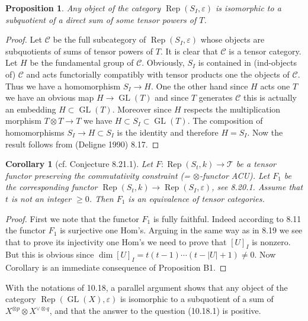 \documentclass[11pt,a4paper]{article}
\theoremstyle{plain}
\newtheorem{proposition}[theorem]{Proposition}
\newtheorem{corollary}[theorem]{Corollary}
\theoremstyle{definition}
\DeclareMathOperator{\Rep}{Rep}
\DeclareMathOperator{\GL}{GL}
\newcommand{\eps}{\varepsilon}
\begin{document}
\begin{proposition}
Any object of the category $\Rep(S_I, \eps)$ is isomorphic to a subquotient of a direct sum of some tensor powers of $T$.
\end{proposition}

\begin{proof}
Let $\mathcal{C}$ be the full subcategory of $\Rep(S_I, \eps)$ whose objects are subquotients of sums of tensor powers of $T$. It is clear that $\mathcal{C}$ is a tensor category. Let $H$ be the fundamental group of $\mathcal{C}$. Obviously, $S_I$ is contained in (ind-objects of) $\mathcal{C}$ and acts functorially compatibly with tensor products one the objects of $\mathcal{C}$. Thus we have a homomorphism $S_I \to H$. One the other hand since $H$ acts one $T$ we have an obvious map $H \to \GL(T)$ and since $T$ generates $\mathcal{C}$ this is actually an embedding $H \subset \GL(T)$. Moreover since $H$ respects the multiplication morphism $T \otimes T \to T$ we have $H \subset S_I \subset \GL(T)$. The composition of homomorphisms $S_I \to H \subset S_I$ is the identity and therefore $H = S_I$. Now the result follows from (Deligne 1990) 8.17.
\end{proof}

\begin{corollary}[cf. Conjecture 8.21.1]
Let $F : \Rep(S_t, k) \to \mathcal{T}$ be a tensor functor preserving the commutativity constraint (= $\otimes$-functor ACU). Let $F_1$ be the corresponding functor $\Rep(S_t, k) \to \Rep(S_I, \eps)$, see 8.20.1. Assume that $t$ is not an integer $\geq 0$. Then $F_1$ is an equivalence of tensor categories.
\end{corollary}

\begin{proof}
First we note that the functor $F_1$ is fully faithful. Indeed according to 8.11 the functor $F_1$ is surjective one Hom's. Arguing in the same way as in 8.19 we see that to prove its injectivity one Hom's we need to prove that $[U]_I$ is nonzero. But this is obvious since $\dim [U]_I = t(t-1)\cdots(t-|U|+1) \neq 0$. Now Corollary is an immediate consequence of Proposition B1.
\end{proof}

With the notations of 10.18, a parallel argument shows that any object of the category $\Rep(\GL(X), \eps)$ is isomorphic to a subquotient of a sum of $X^{\otimes p} \otimes X^{\vee \otimes q}$, and that the answer to the question (10.18.1) is positive.
\end{document}
